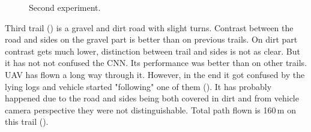 \begin{figure}[!h]

  \centering

  \centering	
  


  \caption{Second experiment.}
  \label{fig:second_trail_photos}
\end{figure}

Third trail () is a gravel and dirt road with slight turns. Contrast between the road and sides on the gravel part is better than on previous trails. On dirt part contrast gets much lower, distinction between trail and sides is not as clear. But it has not not confused the \acs{CNN}. Its performance was better than on other trails. \acs{UAV} has flown a long way through it. However, in the end it got confused by the lying logs and vehicle started "following" one of them (). It has probably happened due to the road and sides being both covered in dirt and from vehicle camera perspective they were not distinguishable. Total path flown is 160\,m on this trail ().

